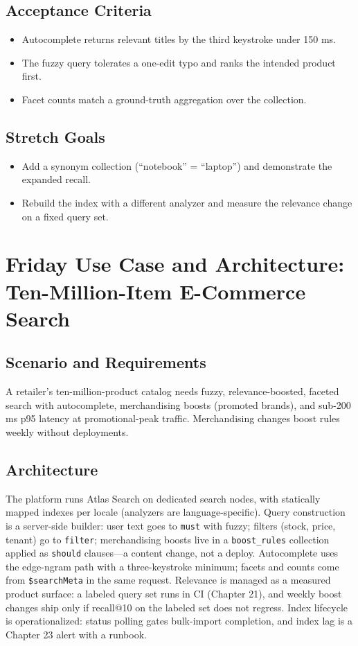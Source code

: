 \subsection*{Acceptance Criteria}
\begin{itemize}
    \item Autocomplete returns relevant titles by the third keystroke under 150 ms.
    \item The fuzzy query tolerates a one-edit typo and ranks the intended product first.
    \item Facet counts match a ground-truth aggregation over the collection.
\end{itemize}

\subsection*{Stretch Goals}
\begin{itemize}
    \item Add a synonym collection (``notebook'' = ``laptop'') and demonstrate the expanded recall.
    \item Rebuild the index with a different analyzer and measure the relevance change on a fixed query set.
\end{itemize}

\section{Friday Use Case and Architecture: Ten-Million-Item E-Commerce Search}
\subsection{Scenario and Requirements}
A retailer's ten-million-product catalog needs fuzzy, relevance-boosted, faceted search with autocomplete, merchandising boosts (promoted brands), and sub-200 ms p95 latency at promotional-peak traffic. Merchandising changes boost rules weekly without deployments.

\subsection{Architecture}
The platform runs Atlas Search on dedicated search nodes, with statically mapped indexes per locale (analyzers are language-specific). Query construction is a server-side builder: user text goes to \texttt{must} with fuzzy; filters (stock, price, tenant) go to \texttt{filter}; merchandising boosts live in a \texttt{boost\_rules} collection applied as \texttt{should} clauses---a content change, not a deploy. Autocomplete uses the edge-ngram path with a three-keystroke minimum; facets and counts come from \texttt{\$searchMeta} in the same request. Relevance is managed as a measured product surface: a labeled query set runs in CI (Chapter 21), and weekly boost changes ship only if recall@10 on the labeled set does not regress. Index lifecycle is operationalized: status polling gates bulk-import completion, and index lag is a Chapter 23 alert with a runbook.

